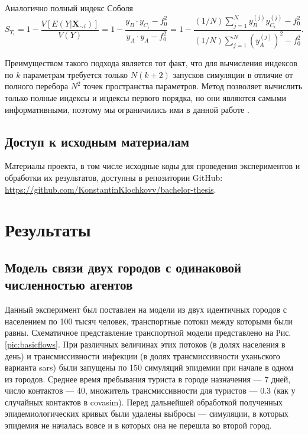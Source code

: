 \documentclass[a4paper,12pt]{article} %
\begin{document}
\begin{itemize}
Аналогично полный индекс Соболя
\begin{displaymath}
S_{T_i}=1-\frac{V[E(Y|\bm{X}_{\sim i})]}{V(Y)}=1-\frac{y_B\cdot y_{C_i}-f_0^2}{y_A\cdot y_A -f_0^2}=1-\frac{(1/N)\sum_{j=1}^N y_B^{(j)}y_{C_i}^{(j)} - f_0^2}{(1/N)\sum_{j=1}^N (y_A^{(j)})^2 - f_0^2}.
\end{displaymath}
\end{itemize}

Преимуществом такого подхода является тот факт, что для вычисления индексов по $k$ параметрам требуется только $N(k+2)$ запусков симуляции в отличие от полного перебора $N^2$ точек пространства параметров. Метод позволяет вычислить только полные индексы и индексы первого порядка, но они являются самыми информативными, поэтому мы ограничились ими в данной работе \cite{saltelli2008global}.

\subsection{Доступ к исходным материалам}
Материалы проекта, в том числе исходные коды для проведения экспериментов и обработки их результатов, доступны в репозитории GitHub: \url{https://github.com/KonstantinKlochkovv/bachelor-thesis}.

\newpage
\section{Результаты}

\subsection{Модель связи двух городов с одинаковой численностью агентов}
Данный эксперимент был поставлен на модели из двух идентичных городов с населением по 100 тысяч человек, транспортные потоки между которыми были равны. Схематичное представление транспортной модели представлено на Рис. \ref{pic:basicflows}. При различных величинах этих потоков (в долях населения в день) и трансмиссивности инфекции (в долях трансмиссивности уханьского варианта \gls{sars}) были запущены по 150 симуляций эпидемии при начале в одном из городов. Среднее время пребывания туриста в городе назначения --- 7 дней, число контактов --- 40, множитель трансмиссивности для туристов --- 0.3 (как у случайных контактов в \gls{covasim}). Перед дальнейшей обработкой полученных эпидемиологических кривых были удалены выбросы --- симуляции, в которых эпидемия не началась вовсе и в которых она не перешла во второй город. 
\end{document}

